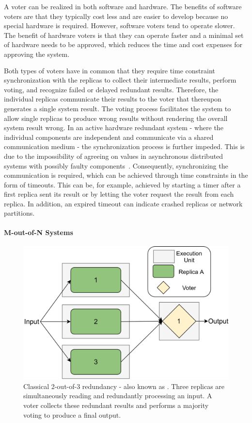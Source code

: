 A voter can be realized in both software and hardware.
The benefits of software voters are that they typically cost less and are easier to develop because no special hardware is required.
However, software voters tend to operate slower.
The benefit of hardware voters is that they can operate faster and a minimal set of hardware needs to be approved, which reduces the time and cost expenses for approving the system.

Both types of voters have in common that they require time constraint synchronization with the replicas to collect their intermediate results, perform voting, and recognize failed or delayed redundant results.
Therefore, the individual replicas communicate their results to the voter that thereupon generates a single system result.
The voting process facilitates the system to allow single replicas to produce wrong results without rendering the overall system result wrong.
In an active hardware redundant system - where the individual components are independent and communicate via a shared communication medium - the synchronization process is further impeded.
This is due to the impossibility of agreeing on values in asynchronous distributed systems with possibly faulty components~\cite{FLPProblemConsensus}.
Consequently, synchronizing the communication is required, which can be achieved through time constraints in the form of timeouts.
This can be, for example, achieved by starting a timer after a first replica sent its result or by letting the voter request the result from each replica.
In addition, an expired timeout can indicate crashed replicas or network partitions.

\paragraph{M-out-of-N Systems}
\begin{figure}[!hb]
	\centering
	\includegraphics[width=0.8\linewidth]{images/Classical2OO3}
	\caption{Classical 2-out-of-3 redundancy - also known as . Three replicas are simultaneously reading and redundantly processing an input. A voter collects these redundant results and performs a majority voting to produce a final output.}
	\label{fig:Classical2OO3}
\end{figure}

